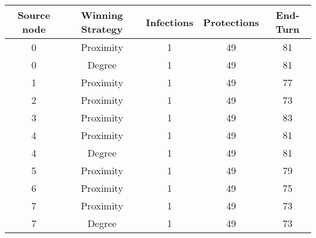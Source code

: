 \documentclass[results.tex]{subfiles}
\begin{document}
    \begin{center}
        \begin{tabular}{| c || c | c | c | c |}
            \hline
            {\bfseries Source node} & {\bfseries Winning Strategy} & {\bfseries Infections} & {\bfseries Protections}
            & {\bfseries End-Turn}
            \\  %
            \hline\hline
            0                       & Proximity                    & 1                      & 49                      & 81                   \\
            \hline
            0                       & Degree                       & 1                      & 49                      & 81                   \\
            \hline
            1                       & Proximity                    & 1                      & 49                      & 77                   \\
            \hline
            2                       & Proximity                    & 1                      & 49                      & 73                   \\
            \hline
            3                       & Proximity                    & 1                      & 49                      & 83                   \\
            \hline
            4                       & Proximity                    & 1                      & 49                      & 81                   \\
            \hline
            4                       & Degree                       & 1                      & 49                      & 81                   \\
            \hline
            5                       & Proximity                    & 1                      & 49                      & 79                   \\
            \hline
            6                       & Proximity                    & 1                      & 49                      & 75                   \\
            \hline
            7                       & Proximity                    & 1                      & 49                      & 73                   \\
            \hline
            7                       & Degree                       & 1                      & 49                      & 73                   \\

\end{tabular}
\end{center}
\end{document}

